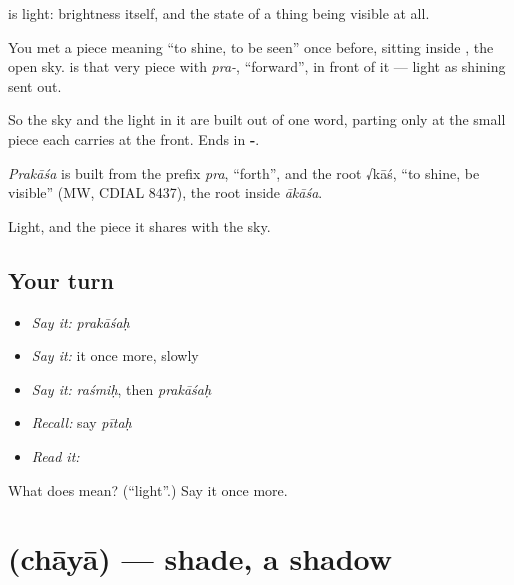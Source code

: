\textbf{} is light: brightness itself, and the state of a thing being visible at all.

You met a piece meaning \textquotedblleft{}to shine, to be seen\textquotedblright{} once before, sitting inside \textbf{}, the open sky. \textbf{} is that very piece with \emph{pra-}, \textquotedblleft{}forward\textquotedblright{}, in front of it — light as shining sent out.

So the sky and the light in it are built out of one word, parting only at the small piece each carries at the front. Ends in \textbf{-}.

\begin{cousinweb}
\emph{Prakāśa} is built from the prefix \emph{pra}, \textquotedblleft{}forth\textquotedblright{}, and the root √kāś, \textquotedblleft{}to shine, be visible\textquotedblright{} (MW, CDIAL 8437), the root inside \emph{ākāśa}.
\end{cousinweb}

\begin{grammarlens}[title={What you've built}]
Light, and the piece it shares with the sky.
\end{grammarlens}

\subsection*{Your turn}
\begin{itemize}
\raggedright
  \item \emph{Say it:} \emph{prakāśaḥ}
  \item \emph{Say it:} it once more, slowly
  \item \emph{Say it:} \emph{raśmiḥ}, then \emph{prakāśaḥ}
  \item \emph{Recall:} say \emph{pītaḥ}
  \item \emph{Read it:} \textbf{}
\end{itemize}

\begin{tcolorbox}[breakable,colback=teal!4,colframe=teal!35!black,title={Before you move on}]
What does  mean? (\textquotedblleft{}light\textquotedblright{}.) Say it once more.
\end{tcolorbox}
\section[\texorpdfstring{\sk{छाया} (chāyā)}{छाया (chāyā)}]{ (chāyā) — shade, a shadow}

